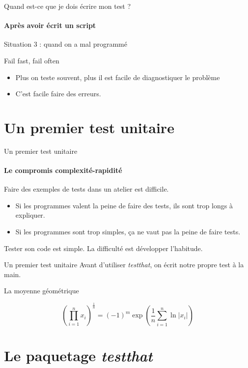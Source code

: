 \documentclass[11pt]{beamer}
\newcommand{\gotoR}[1]{%
	\begin{center}
		\colorbox{ulgold}{\color{black}
			\makebox[50mm][c]{%
				\makebox[5mm]{\raisebox{-1pt}{\large\faChevronCircleDown}}\;%
				{\ttfamily #1}}}
\end{center}}
\begin{document}
\begin{frame}{Quand est-ce que je dois écrire mon test ?}
\framesubtitle{Après avoir écrit un script}
Situation 3 : quand on a mal programmé
\begin{block}{}
Fail fast, fail often
\end{block}
\begin{itemize}
\item Plus on teste souvent, plus il est facile de diagnostiquer le problème
\item C'est facile faire des erreurs.
\end{itemize}
\end{frame}

\section{Un premier test unitaire}

\begin{frame}{Un premier test unitaire}
\framesubtitle{Le compromis complexité-rapidité}
Faire des exemples de tests dans un atelier est difficile.
\begin{itemize}
\item Si les programmes valent la peine de faire des tests, ils sont trop longs à expliquer.
\item Si les programmes sont trop simples, ça ne vaut pas la peine de faire tests.
\end{itemize}

Tester son code est simple. La difficulté est développer l'habitude.
\end{frame}

\begin{frame}{Un premier test unitaire}
Avant d'utiliser \textit{testthat}, on écrit notre propre test à la main.

\begin{block}{La moyenne géométrique}
\gotoR{partie\_0/exemple\_1.R}
\begin{equation*}
\left(\prod_{i = 1}^{n}x_i\right)^{\frac{1}{n}}  =
(-1)^m \exp\left(\frac{1}{n}\sum_{i = 1}^{n}\ln |x_i|\right)
\end{equation*}

\end{block}
\end{frame}


\section{Le paquetage \emph{testthat}}
\end{document}
